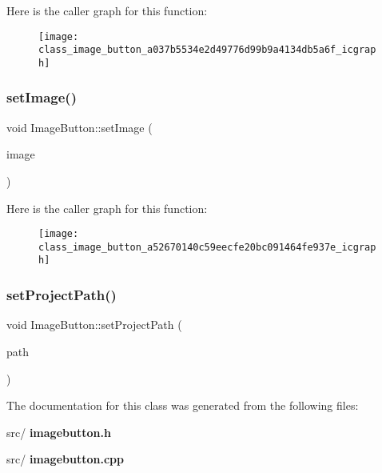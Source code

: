 Here is the caller graph for this function\+:\nopagebreak
\begin{figure}[H]
\begin{center}
\leavevmode
\texttt{[image: class\_image\_button\_a037b5534e2d49776d99b9a4134db5a6f\_icgraph]}
\end{center}
\end{figure}
\mbox{\label{class_image_button_a52670140c59eecfe20bc091464fe937e}} 
\subsubsection{set\+Image()}
{\footnotesize\ttfamily void Image\+Button\+::set\+Image (\begin{DoxyParamCaption}\item[{Q\+String}]{image }\end{DoxyParamCaption})}

Here is the caller graph for this function\+:\nopagebreak
\begin{figure}[H]
\begin{center}
\leavevmode
\texttt{[image: class\_image\_button\_a52670140c59eecfe20bc091464fe937e\_icgraph]}
\end{center}
\end{figure}
\mbox{\label{class_image_button_a4907279ecbbc177c07ec794fae10d089}} 
\subsubsection{set\+Project\+Path()}
{\footnotesize\ttfamily void Image\+Button\+::set\+Project\+Path (\begin{DoxyParamCaption}\item[{Q\+String}]{path }\end{DoxyParamCaption})}



The documentation for this class was generated from the following files\+:\begin{DoxyCompactItemize}
\item 
src/\textbf{ imagebutton.\+h}\item 
src/\textbf{ imagebutton.\+cpp}\end{DoxyCompactItemize}

